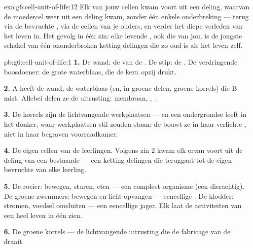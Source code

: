 \begin{solution}{exo:g6:cell-unit-of-life:12}
Elk van jouw cellen kwam voort uit een deling, waarvan de moedercel weer
uit een deling kwam, zonder één enkele onderbreking --- terug via de
bevruchte , via de cellen van je ouders, en verder het diepe
verleden van het leven in. Het gevolg in één zin: elke levende , ook
die van jou, is de jongste schakel van één ononderbroken ketting delingen
die zo oud is als het leven zelf.
\end{solution}

\begin{solution}{pb:g6:cell-unit-of-life:1}
\textbf{1.} De wand: de  van de . De stip: de . De
verdringende boosdoener: de grote waterblaas, die de kern opzij drukt.

\textbf{2.} A heeft de wand, de waterblaas (en, in groene delen, groene
korrels) die B mist. Allebei delen ze de uitrusting: membraan,
, .

\textbf{3.} De korrels zijn de lichtvangende werkplaatsen --- en een
ondergrondse  leeft in het donker, waar werkplaatsen stil zouden
staan: de  bouwt ze in haar verlichte , niet in haar
begraven voorraadkamer.

\textbf{4.} De eigen cellen van de leerlingen. Volgens zin 2 kwam elk
ervan voort uit de deling van een bestaande  --- een ketting delingen
die teruggaat tot de eigen bevruchte  van elke leerling.

\textbf{5.} De roeier: bewegen, sturen, eten --- een compleet 
organisme (een dierachtig). De groene zwemmers: bewegen en licht
opvangen --- eencellige . De klodder: stromen, voedsel
omsluiten --- een eencellige jager. Elk laat de activiteiten van een heel
leven in één  zien.

\textbf{6.} De groene korrels --- de lichtvangende uitrusting die de
fabricage van de  draait.


\end{solution}
